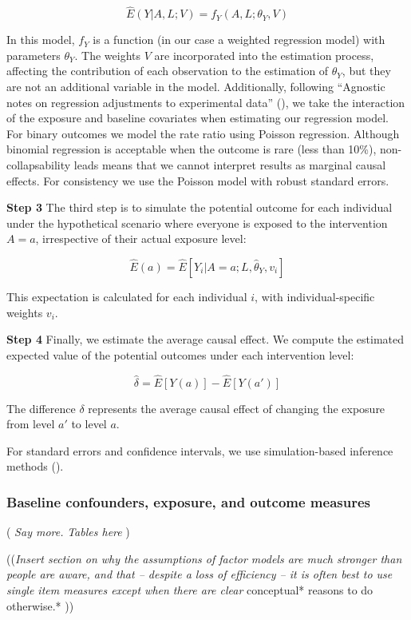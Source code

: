 \documentclass[
  singlecolumn,
  9pt]{article}
\begin{document}
\[ \hat{E}(Y|A, L; V) = f_Y(A, L ; \theta_Y, V) \]

In this model, \(f_Y\) is a function (in our case a weighted regression
model) with parameters \(θ_Y\). The weights \(V\) are incorporated into
the estimation process, affecting the contribution of each observation
to the estimation of \(θ_Y\), but they are not an additional variable in
the model. Additionally, following {``Agnostic notes on regression
adjustments to experimental data''} (), we
take the interaction of the exposure and baseline covariates when
estimating our regression model. For binary outcomes we model the rate
ratio using Poisson regression. Although binomial regression is
acceptable when the outcome is rare (less than 10\%), non-collapsability
leads means that we cannot interpret results as marginal causal effects.
For consistency we use the Poisson model with robust standard errors.

\textbf{Step 3} The third step is to simulate the potential outcome for
each individual under the hypothetical scenario where everyone is
exposed to the intervention \(A=a\), irrespective of their actual
exposure level:

\[\hat{E}(a) = \hat{E}[Y_i|A=a; L,\hat{\theta}_Y, v_i]\]

This expectation is calculated for each individual \(i\), with
individual-specific weights \(v_i\).

\textbf{Step 4} Finally, we estimate the average causal effect. We
compute the estimated expected value of the potential outcomes under
each intervention level:

\[\hat{\delta} = \hat{E}[Y(a)] - \hat{E}[Y(a')]\]

The difference \(\delta\) represents the average causal effect of
changing the exposure from level \(a'\) to level \(a\).

For standard errors and confidence intervals, we use simulation-based
inference methods ().

\subsubsection{Baseline confounders, exposure, and outcome
measures}\label{baseline-confounders-exposure-and-outcome-measures}

( \emph{Say more.} \emph{Tables here} )

((\emph{Insert section on why the assumptions of factor models are much
stronger than people are aware, and that -- despite a loss of efficiency
-- it is often best to use single item measures except when there are
clear} conceptual* reasons to do otherwise.* ))
\end{document}

